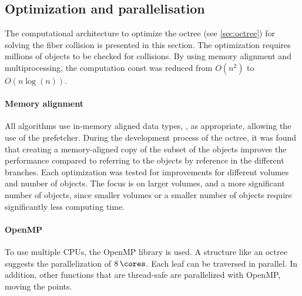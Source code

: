 \subsection{Optimization and parallelisation}\label{sec:modelOpt}
% 
The computational architecture to optimize the octree (see \cref{sec:octree}) for solving the fiber collision is presented in this section.
The optimization requires millions of objects to be checked for collisions.
By using memory alignment and multiprocessing, the computation const was reduced from $O(n^2)$ to $O(n\log(n))$.
% 
%
\paragraph{Memory alignment}
All algorithms use in-memory aligned data types, \eg{} , as appropriate, allowing the use of the  prefetcher.
During the development process of the octree, it was found that creating a memory-aligned copy of the subset of the objects improves the performance compared to referring to the objects by reference in the different branches.
Each optimization was tested for improvements for different volumes and number of objects.
The focus is on larger volumes, and a more significant number of objects, since smaller volumes or a smaller number of objects require significantly less computing time.
%
%
\paragraph{OpenMP}
To use multiple \acp{CPU}, the \ac{OpenMP} library is used.
A structure like an octree suggests the parallelization of $\SI{8}{\cores}$.
Each leaf can be traversed in parallel.
In addition, other functions that are thread-safe are parallelized with \ac{OpenMP}, \eg{} moving the points.
%
%
%
